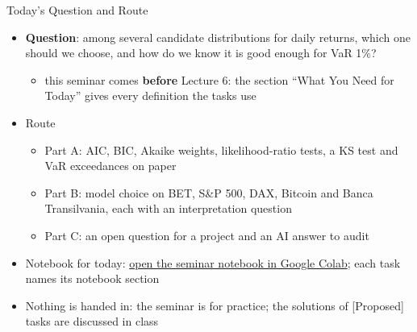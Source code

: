 \begin{frame}{Today's Question and Route}
\itemsize{\small}
\begin{itemize}
    \item \textbf{Question}: among several candidate distributions for daily returns, which one should we choose, and how do we know it is good enough for VaR 1\%?
    \begin{itemize}
        \item this seminar comes \textbf{before} Lecture 6: the section ``What You Need for Today'' gives every definition the tasks use
    \end{itemize}
    \item Route
    \begin{itemize}
        \item Part A: AIC, BIC, Akaike weights, likelihood-ratio tests, a KS test and VaR exceedances on paper
        \item Part B: model choice on BET, S\&P 500, DAX, Bitcoin and Banca Transilvania, each with an interpretation question
        \item Part C: an open question for a project and an AI answer to audit
    \end{itemize}
    \item Notebook for today: \href{\nb}{open the seminar notebook in Google Colab}; each task names its notebook section
    \item Nothing is handed in: the seminar is for practice; the solutions of [Proposed] tasks are discussed in class
\end{itemize}
\end{frame}

